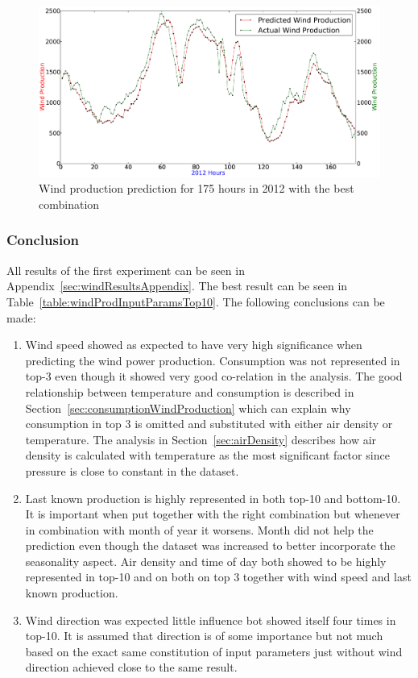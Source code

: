 \begin{figure}[H]
\centering
\includegraphics[width=0.99\linewidth]{billeder/bestInputParameterPrediction.png}
\caption{Wind production prediction for 175 hours in 2012 with the best combination}
\label{fig:bestInputParameterPrediction}
\end{figure}   

\subsubsection{Conclusion}
All results of the first experiment can be seen in Appendix~\ref{sec:windResultsAppendix}. The best result can be seen in Table~\ref{table:windProdInputParamsTop10}. The following conclusions can be made: 

\begin{enumerate}
\item Wind speed showed as expected to have very high significance when predicting the wind power production. Consumption was not represented in top-3 even though it showed very good co-relation in the analysis. The good relationship between temperature and consumption is described in Section~\ref{sec:consumptionWindProduction} which can explain why consumption in top 3 is omitted and substituted with either air density or temperature. The analysis in Section~\ref{sec:airDensity} describes how air density is calculated with temperature as the most significant factor since pressure is close to constant in the dataset.   
\item Last known production is highly represented in both top-10 and bottom-10. It is important when put together with the right combination but whenever in combination with month of year it worsens. Month did not help the prediction even though the dataset was increased to better incorporate the seasonality aspect. Air density and time of day both showed to be highly represented in top-10 and on both on top 3 together with wind speed and last known production.
\item Wind direction was expected little influence bot showed itself four times in top-10. It is assumed that direction is of some importance but not much based on the exact same constitution of input parameters just without wind direction achieved close to the same result.
\end{enumerate}

